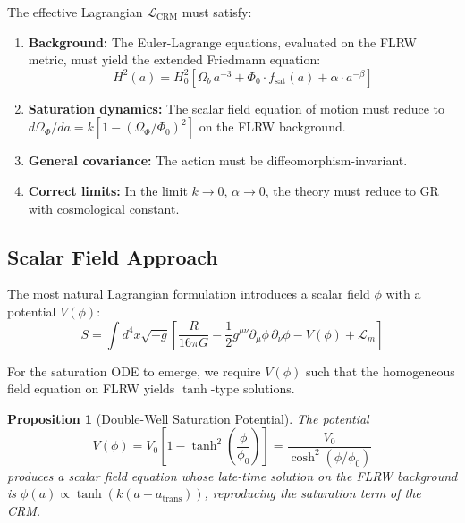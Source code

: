 \documentclass[aps,prd,twocolumn,superscriptaddress,nofootinbib]{revtex4-2}
\newtheorem{proposition}{Proposition}
\begin{document}
The effective Lagrangian $\mathcal{L}_{\mathrm{CRM}}$ must satisfy:
\begin{enumerate}
\item \textbf{Background:} The Euler-Lagrange equations, evaluated on the FLRW metric, must yield the extended Friedmann equation:
\begin{equation}
H^2(a) = H_0^2 \left[\Omega_b\,a^{-3} + \Phi_0 \cdot f_{\mathrm{sat}}(a) + \alpha \cdot a^{-\beta}\right]
\end{equation}

\item \textbf{Saturation dynamics:} The scalar field equation of motion must reduce to $d\Omega_\Phi/da = k[1 - (\Omega_\Phi/\Phi_0)^2]$ on the FLRW background.

\item \textbf{General covariance:} The action must be diffeomorphism-invariant.

\item \textbf{Correct limits:} In the limit $k \to 0$, $\alpha \to 0$, the theory must reduce to GR with cosmological constant.
\end{enumerate}

\subsection{Scalar Field Approach}

The most natural Lagrangian formulation introduces a scalar field $\phi$ with a potential $V(\phi)$:
\begin{equation}
S = \int d^4x \sqrt{-g} \left[\frac{R}{16\pi G} - \frac{1}{2} g^{\mu\nu}\partial_\mu\phi\,\partial_\nu\phi - V(\phi) + \mathcal{L}_m\right]
\label{eq:action_scalar}
\end{equation}

For the saturation ODE to emerge, we require $V(\phi)$ such that the homogeneous field equation on FLRW yields $\tanh$-type solutions.

{\sloppy
\begin{proposition}[Double-Well Saturation Potential]
The potential
\begin{equation}
V(\phi) = V_0 \left[1 - \tanh^2\!\left(\frac{\phi}{\phi_0}\right)\right] = \frac{V_0}{\cosh^2(\phi/\phi_0)}
\label{eq:double_well}
\end{equation}
produces a scalar field equation whose late-time solution on the FLRW background is $\phi(a) \propto \tanh(k(a - a_{\mathrm{trans}}))$, reproducing the saturation term of the CRM.
\end{proposition}
}
\end{document}
